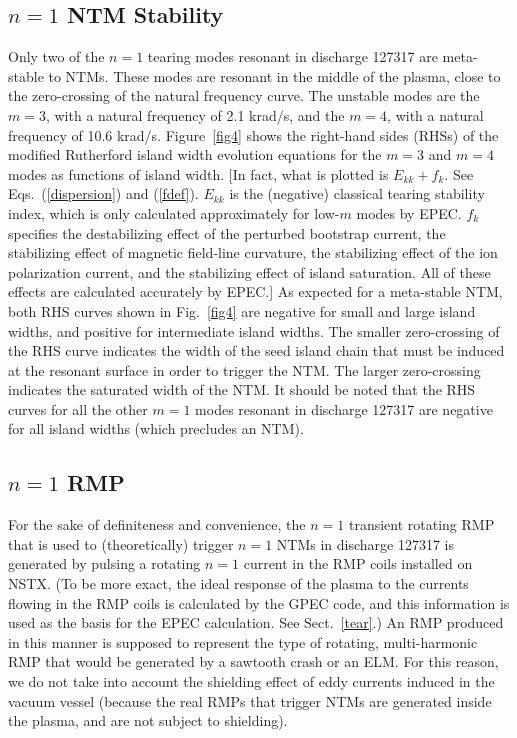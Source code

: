 \documentclass[12pt,prb,aps]{revtex4-1}
\begin{document}
\subsection{$n=1$ NTM Stability}
Only two of the $n=1$ tearing modes resonant in discharge 127317 are meta-stable to NTMs. These modes are resonant in the middle of the plasma, close to the zero-crossing of the natural frequency curve. The unstable modes are the $m=3$, with a natural
frequency of 2.1 krad/s, and the $m=4$, with a natural frequency of 10.6 krad/s. Figure~\ref{fig4} shows the
right-hand sides (RHSs) of the modified Rutherford island width evolution equations for the $m=3$ and $m=4$ modes as functions of island
width. [In fact, what is plotted is $E_{kk} + f_k$. See Eqs.~(\ref{dispersion}) and (\ref{fdef}). $E_{kk}$ is the (negative)
classical tearing stability index, which is only calculated approximately for low-$m$ modes by EPEC. $f_k$ specifies the
destabilizing effect of the perturbed bootstrap current, the stabilizing effect of magnetic field-line curvature, the
stabilizing effect of the ion polarization current, and the stabilizing effect of island saturation. All of these effects are calculated accurately by EPEC.] As expected for a meta-stable NTM, both RHS curves shown in Fig.~\ref{fig4} are negative for small and large island widths, and positive for intermediate island widths. The smaller zero-crossing of the RHS curve indicates the width of the seed island chain 
that must be induced at the resonant surface in order to trigger the NTM. The larger zero-crossing indicates the
saturated width of the NTM. It should be noted that the RHS curves for all the other $m=1$ modes resonant in discharge 127317
are negative for all island widths (which precludes an NTM). 

\subsection{$n=1$ RMP}
For the sake of definiteness and convenience, the $n=1$ transient rotating RMP that is used to (theoretically) trigger $n=1$ NTMs in discharge 127317 is generated  by pulsing a rotating $n=1$ current in the RMP coils installed on NSTX. (To be more
exact, the ideal response of the plasma to the currents flowing in the RMP coils is calculated by the GPEC code,\cite{gpec} and
this information is used as the basis for the EPEC calculation. See Sect.~\ref{tear}.)
An RMP produced in this manner is supposed to represent the type of rotating, multi-harmonic RMP that would be generated by a
sawtooth crash or an ELM. 
For this reason, we do not take into account the shielding effect of eddy currents induced in the vacuum vessel (because the real RMPs that trigger NTMs are generated inside the plasma, and are not subject to shielding). 
\end{document}
